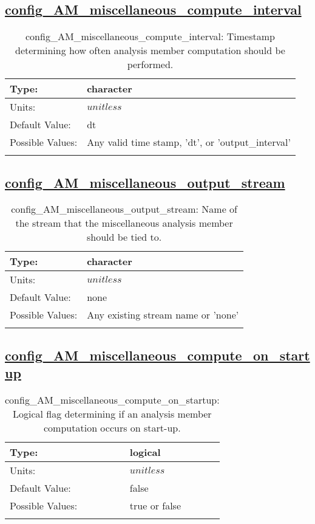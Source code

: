 \subsection[config\_AM\_miscellaneous\_compute\_interval]{\hyperref[sec:nm_tab_AM_miscellaneous]{config\_AM\_miscellaneous\_compute\_interval}}
\label{subsec:nm_sec_config_AM_miscellaneous_compute_interval}
\begin{center}
\begin{longtable}{| p{2.0in} || p{4.0in} |}
    \hline
    Type: & character \\
    \hline
    Units: & $unitless$ \\
    \hline
    Default Value: & dt \\
    \hline
    Possible Values: & Any valid time stamp, 'dt', or 'output\_interval' \\
    \hline
    \caption{config\_AM\_miscellaneous\_compute\_interval: Timestamp determining how often analysis member computation should be performed.}
\end{longtable}
\end{center}
\subsection[config\_AM\_miscellaneous\_output\_stream]{\hyperref[sec:nm_tab_AM_miscellaneous]{config\_AM\_miscellaneous\_output\_stream}}
\label{subsec:nm_sec_config_AM_miscellaneous_output_stream}
\begin{center}
\begin{longtable}{| p{2.0in} || p{4.0in} |}
    \hline
    Type: & character \\
    \hline
    Units: & $unitless$ \\
    \hline
    Default Value: & none \\
    \hline
    Possible Values: & Any existing stream name or 'none' \\
    \hline
    \caption{config\_AM\_miscellaneous\_output\_stream: Name of the stream that the miscellaneous analysis member should be tied to.}
\end{longtable}
\end{center}
\subsection[config\_AM\_miscellaneous\_compute\_on\_startup]{\hyperref[sec:nm_tab_AM_miscellaneous]{config\_AM\_miscellaneous\_compute\_on\_startup}}
\label{subsec:nm_sec_config_AM_miscellaneous_compute_on_startup}
\begin{center}
\begin{longtable}{| p{2.0in} || p{4.0in} |}
    \hline
    Type: & logical \\
    \hline
    Units: & $unitless$ \\
    \hline
    Default Value: & false \\
    \hline
    Possible Values: & true or false \\
    \hline
    \caption{config\_AM\_miscellaneous\_compute\_on\_startup: Logical flag determining if an analysis member computation occurs on start-up.}
\end{longtable}
\end{center}
